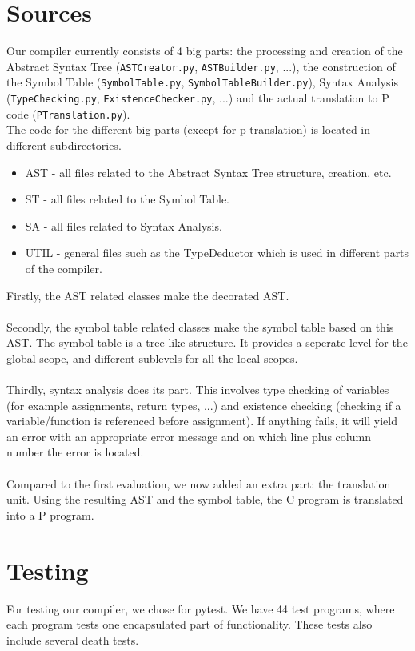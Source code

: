 \documentclass{article}
\begin{document}
\section{Sources}
Our compiler currently consists of 4 big parts: the processing and creation of the Abstract Syntax Tree (\texttt{ASTCreator.py}, \texttt{ASTBuilder.py}, ...), the construction of the Symbol Table (\texttt{SymbolTable.py}, \texttt{SymbolTableBuilder.py}), Syntax Analysis (\texttt{TypeChecking.py}, \texttt{ExistenceChecker.py}, ...) and the actual translation to P code (\texttt{PTranslation.py}).
\\
The code for the different big parts (except for p translation) is located in different subdirectories. \\
\begin{itemize}
	\item AST - all files related to the Abstract Syntax Tree structure, creation, etc.
	\item ST - all files related to the Symbol Table.
	\item SA - all files related to Syntax Analysis.
	\item UTIL - general files such as the TypeDeductor which is used in different parts of the compiler.
\end{itemize}

\newpage
\hfill \break
Firstly, the AST related classes make the decorated AST. \\ \\
Secondly, the symbol table related classes make the symbol table based on this AST. The symbol table is a tree like structure. It provides a seperate level for the global scope, and different sublevels for all the local scopes. \\ \\
Thirdly, syntax analysis does its part. This involves type checking of variables (for example assignments, return types, ...) and existence checking (checking if a variable/function is referenced before assignment). If anything fails, it will yield an error with an appropriate error message and on which line plus column number the error is located. \\ \\
\hfill \break
Compared to the first evaluation, we now added an extra part: the translation unit. Using the resulting AST and the symbol table, the C program is translated into a P program.

\section{Testing}
For testing our compiler, we chose for pytest. We have 44 test programs, where each program tests one encapsulated part of functionality. These tests also include several death tests.
\end{document}
